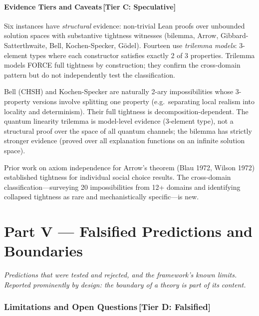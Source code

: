 \documentclass[11pt,a4paper]{article}
\begin{document}
\subsection{Evidence Tiers and Caveats\,\textnormal{\normalsize[Tier C: Speculative]}}

Six instances have \emph{structural} evidence: non-trivial Lean proofs over unbounded solution spaces with substantive tightness witnesses (bilemma, Arrow, Gibbard-Satterthwaite, Bell, Kochen-Specker, G\"odel).  Fourteen use \emph{trilemma models}: 3-element types where each constructor satisfies exactly 2 of 3 properties.  Trilemma models FORCE full tightness by construction; they confirm the cross-domain pattern but do not independently test the classification.

Bell (CHSH) and Kochen-Specker are naturally 2-ary impossibilities whose 3-property versions involve splitting one property (e.g.\ separating local realism into locality and determinism).  Their full tightness is decomposition-dependent.  The quantum linearity trilemma is model-level evidence (3-element type), not a structural proof over the space of all quantum channels; the bilemma has strictly stronger evidence (proved over all explanation functions on an infinite solution space).

Prior work on axiom independence for Arrow's theorem (Blau 1972, Wilson 1972) established tightness for individual social choice results.  The cross-domain classification---surveying 20 impossibilities from 12+ domains and identifying collapsed tightness as rare and mechanistically specific---is new.


\clearpage
\part{Part V \textnormal{\large --- Falsified Predictions and Boundaries}}
\noindent\emph{Predictions that were tested and rejected, and the framework's known limits. Reported prominently by design: the boundary of a theory is part of its content.}\par\medskip

\section{Limitations and Open Questions\,\textnormal{\normalsize[Tier D: Falsified]}}
\label{sec:limitations}
\end{document}
